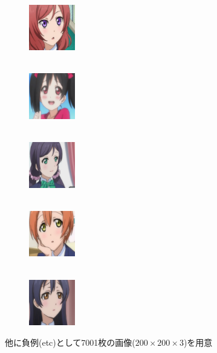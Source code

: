 \documentclass[dvipdfmx,11pt,notheorems]{beamer}
\theoremstyle{definition}
\begin{document}
\begin{frame}
\begin{figure}[t]
 \begin{minipage}{0.17\hsize}
  \centering
   \\
  \centering
  \includegraphics[width=20mm,bb=0 0 200 200]{./fig/png/faces/maki.png}\\
 \end{minipage}
 \begin{minipage}{0.17\hsize}
  \centering
   \\
  \centering
  \includegraphics[width=20mm,bb=0 0 200 200]{./fig/png/faces/niko.png}\\
 \end{minipage}
 \begin{minipage}{0.17\hsize}
  \centering
   \\
  \centering
  \includegraphics[width=20mm,bb=0 0 200 200]{./fig/png/faces/nozomi.png}\\
 \end{minipage}
 \begin{minipage}{0.17\hsize}
  \centering
   \\
  \centering
  \includegraphics[width=20mm,bb=0 0 200 200]{./fig/png/faces/rin.png} \\
 \end{minipage}
 \begin{minipage}{0.17\hsize}
  \centering
   \\
  \centering
  \includegraphics[width=20mm,bb=0 0 200 200]{./fig/png/faces/umi.png}\\
 \end{minipage}
 \end{figure}
他に負例(etc)として7001枚の画像($200\times200\times3$)を用意
\end{frame}
\end{document}
